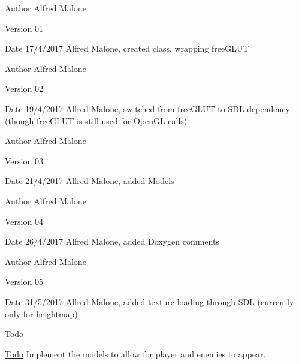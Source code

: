 \begin{DoxyAuthor}{Author}
Alfred Malone 
\end{DoxyAuthor}
\begin{DoxyVersion}{Version}
01 
\end{DoxyVersion}
\begin{DoxyDate}{Date}
17/4/2017 Alfred Malone, created class, wrapping free\+G\+L\+U\+T
\end{DoxyDate}
\begin{DoxyAuthor}{Author}
Alfred Malone 
\end{DoxyAuthor}
\begin{DoxyVersion}{Version}
02 
\end{DoxyVersion}
\begin{DoxyDate}{Date}
19/4/2017 Alfred Malone, switched from free\+G\+L\+U\+T to S\+D\+L dependency (though free\+G\+L\+U\+T is still used for Open\+G\+L calls)
\end{DoxyDate}
\begin{DoxyAuthor}{Author}
Alfred Malone 
\end{DoxyAuthor}
\begin{DoxyVersion}{Version}
03 
\end{DoxyVersion}
\begin{DoxyDate}{Date}
21/4/2017 Alfred Malone, added Models
\end{DoxyDate}
\begin{DoxyAuthor}{Author}
Alfred Malone 
\end{DoxyAuthor}
\begin{DoxyVersion}{Version}
04 
\end{DoxyVersion}
\begin{DoxyDate}{Date}
26/4/2017 Alfred Malone, added Doxygen comments
\end{DoxyDate}
\begin{DoxyAuthor}{Author}
Alfred Malone 
\end{DoxyAuthor}
\begin{DoxyVersion}{Version}
05 
\end{DoxyVersion}
\begin{DoxyDate}{Date}
31/5/2017 Alfred Malone, added texture loading through S\+D\+L (currently only for heightmap)
\end{DoxyDate}
\begin{DoxyRefDesc}{Todo}
\item[\hyperlink{todo__todo000001}{Todo}]Implement the models to allow for player and enemies to appear. \end{DoxyRefDesc}


